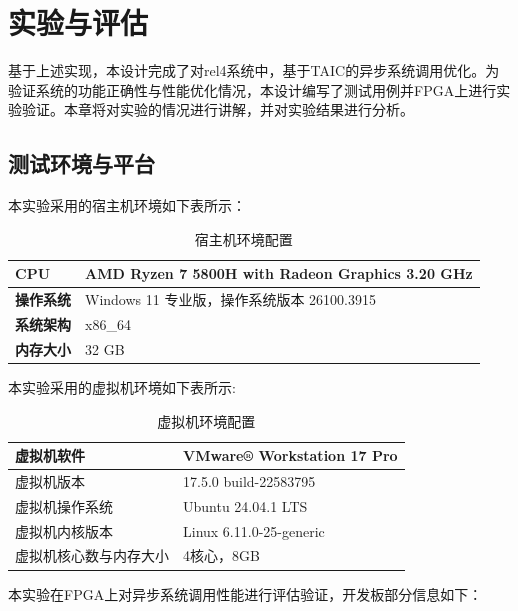 \chapter{实验与评估}

基于上述实现，本设计完成了对rel4系统中，基于TAIC的异步系统调用优化。为验证系统的功能正确性与性能优化情况，本设计编写了测试用例并FPGA上进行实验验证。本章将对实验的情况进行讲解，并对实验结果进行分析。

\section{测试环境与平台}

本实验采用的宿主机环境如下表所示：

\begin{table}[htbp]
\centering
\renewcommand{\arraystretch}{1.2}
\begin{tabular}{|l|l|}
\hline
\textbf{CPU} & AMD Ryzen 7 5800H with Radeon Graphics 3.20 GHz \\
\hline
\textbf{操作系统} & Windows 11 专业版，操作系统版本	26100.3915 \\
\hline
\textbf{系统架构} & x86\_64 \\
\hline
\textbf{内存大小} & 32 GB \\
\hline
\end{tabular}
\caption{宿主机环境配置}
\label{tab:experiment-platform}
\end{table}


本实验采用的虚拟机环境如下表所示:

\begin{table}[htbp]
\centering
\renewcommand{\arraystretch}{1.2}
\begin{tabular}{|l|l|}
\hline
虚拟机软件 & VMware® Workstation 17 Pro \\
\hline
虚拟机版本 & 17.5.0 build-22583795 \\
\hline
虚拟机操作系统 & Ubuntu 24.04.1 LTS \\
\hline
虚拟机内核版本 & Linux 6.11.0-25-generic \\
\hline
虚拟机核心数与内存大小 & 4核心，8GB \\
\hline
\end{tabular}
\caption{虚拟机环境配置}
\label{tab:vmware-platform}
\end{table}

本实验在FPGA上对异步系统调用性能进行评估验证，开发板部分信息如下：


